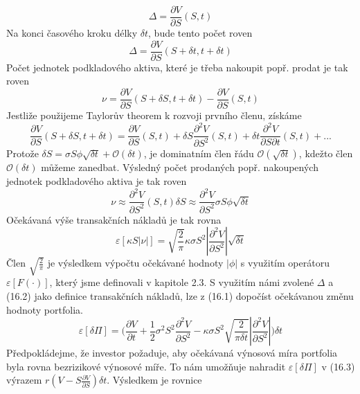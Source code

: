 \documentclass[a4paper]{book}
\begin{document}
\begin{equation*}
\Delta = \frac{\partial V}{\partial S}(S,t)
\end{equation*}
Na konci časového kroku délky $\delta t$, bude tento počet roven
\begin{equation*}
\Delta = \frac{\partial V}{\partial S}(S + \delta t,t + \delta t)
\end{equation*}
Počet jednotek podkladového aktiva, které je třeba nakoupit popř. prodat je tak roven
\begin{equation*}
\nu = \frac{\partial V}{\partial S}(S + \delta S, t + \delta t) - \frac{\partial V}{\partial S}(S,t)
\end{equation*}
Jestliže použijeme Taylorův theorem k rozvoji prvního členu, získáme
\begin{equation*}
\frac{\partial V}{\partial S}(S + \delta S, t + \delta t) = \frac{\partial V}{\partial S}(S,t) + \delta S \frac{\partial^2 V}{\partial S^2}(S,t) + \delta t \frac{\partial^2 V}{\partial S \partial t}(S,t) + ...
\end{equation*}
Protože $\delta S = \sigma S \phi \sqrt{\delta t} + \mathcal{O}(\delta t)$, je dominatním člen řádu $\mathcal{O}(\sqrt{\delta t})$, kdežto člen $\mathcal{O}(\delta t)$ můžeme zanedbat. Výsledný počet prodaných popř. nakoupených jednotek podkladového aktiva je tak roven
\begin{equation*}
\nu \approx \frac{\partial^2 V}{\partial S^2}(S,t)\delta S \approx \frac{\partial^2 V}{\partial S^2}\sigma S \phi \sqrt{\delta t}
\end{equation*}
Očekávaná výše transakčních nákladů je tak rovna
\begin{equation}
\varepsilon[\kappa S |\nu|] = \sqrt{\frac{2}{\pi}} \kappa \sigma S^2 \left| \frac{\partial^2 V}{\partial S^2} \right| \sqrt{\delta t}
\end{equation}
Člen $\sqrt{\frac{2}{\pi}}$ je výsledkem výpočtu očekávané hodnoty $|\phi|$ s využitím operátoru $\varepsilon[F(\cdot)]$, který jsme definovali v kapitole 2.3. S využitím námi zvolené $\Delta$ a (16.2) jako definice transakčních nákladů, lze z (16.1) dopočíst očekávanou změnu hodnoty portfolia.
\begin{equation}
\varepsilon[\delta \Pi] = \Bigg( \frac{\partial V}{\partial t} + \frac{1}{2} \sigma^2 S^2 \frac{\partial^2 V}{\partial S^2} - \kappa \sigma S^2 \sqrt{\frac{2}{\pi \delta t}} \left| \frac{\partial^2 V}{\partial S^2} \right| \Bigg) \delta t
\end{equation}
Předpokládejme, že investor požaduje, aby očekávaná výnosová míra portfolia byla rovna bezrizikové výnosové míře. To nám umožňuje nahradit $\varepsilon[\delta \Pi]$ v (16.3) výrazem $r(V - S \frac{\partial V}{\partial S}) \delta t$. Výsledkem je rovnice
\end{document}

